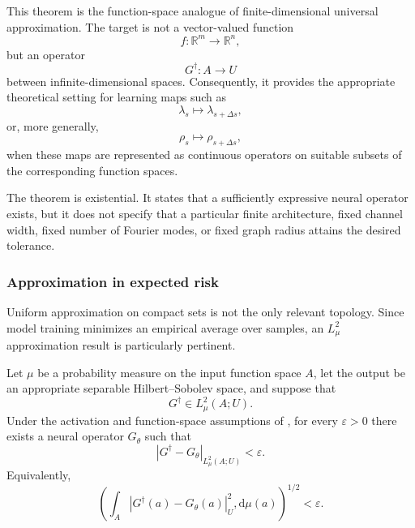 \documentclass[11pt,a4paper]{article}
\begin{document}
\begin{sloppypar}
This theorem is the function-space analogue of finite-dimensional universal approximation. The target is not a vector-valued function
\begin{equation}
f:\mathbb{R}^{m}\to\mathbb{R}^{n},
\end{equation}
but an operator
\begin{equation}
G^\dagger:A\to U
\end{equation}
between infinite-dimensional spaces. Consequently, it provides the appropriate theoretical setting for learning maps such as
\begin{equation}
\lambda_s
\longmapsto
\lambda_{s+\Delta s},
\end{equation}
or, more generally,
\begin{equation}
\rho_s
\longmapsto
\rho_{s+\Delta s},
\end{equation}
when these maps are represented as continuous operators on suitable subsets of the corresponding function spaces.

The theorem is existential. It states that a sufficiently expressive neural operator exists, but it does not specify that a particular finite architecture, fixed channel width, fixed number of Fourier modes, or fixed graph radius attains the desired tolerance.

\subsubsection{Approximation in expected risk}

Uniform approximation on compact sets is not the only relevant topology. Since model training minimizes an empirical average over samples, an $L^2_\mu$ approximation result is particularly pertinent.

\begin{theorem}
Let $\mu$ be a probability measure on the input function space $A$, let the output be an appropriate separable Hilbert--Sobolev space, and suppose that
\begin{equation}
G^\dagger
\in
L^2_\mu(A;U).
\end{equation}
Under the activation and function-space assumptions of \cite{kovachki_neural_2023}, for every $\varepsilon>0$ there exists a neural operator $G_\theta$ such that
\begin{equation}
\left|
G^\dagger
-
G_\theta
\right|_{L^2_\mu(A;U)}
<
\varepsilon.
\label{eq:theorem-l2-operator}
\end{equation}
Equivalently,
\begin{equation}
\left(
\int_A
\left|
G^\dagger(a)
-
G_\theta(a)
\right|_U^2
,\mathrm{d}\mu(a)
\right)^{1/2}
<
\varepsilon.
\end{equation}
\end{theorem}


\end{sloppypar}
\end{document}
